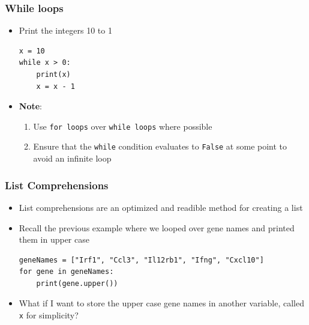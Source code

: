 \documentclass[xcolor=table]{beamer}
\begin{document}
\begin{frame}[fragile]
\frametitle{While loops}

\begin{itemize}

\item Print the integers 10 to 1
\begin{lstlisting}[style=python]
x = 10
while x > 0:
    print(x)
    x = x - 1
\end{lstlisting}

\item \textbf{Note}: 
\begin{enumerate}\addtolength{\itemsep}{0.5\baselineskip}
\item Use \texttt{for loops} over \texttt{while loops} where possible
\item Ensure that the \texttt{while} condition evaluates to 
\texttt{False} at some point to avoid an infinite loop
\end{enumerate}

\end{itemize}

\end{frame}

\begin{frame}[fragile]
\frametitle{List Comprehensions}

\begin{itemize}\addtolength{\itemsep}{0.5\baselineskip}

\item<1-> List comprehensions are an optimized and readible method for creating a list

\item<2-> Recall the previous example where we looped over gene names and printed them in upper
case
\begin{lstlisting}[style=python]
geneNames = ["Irf1", "Ccl3", "Il12rb1", "Ifng", "Cxcl10"]
for gene in geneNames:
    print(gene.upper())
\end{lstlisting}

\item<3-> What if I want to store the upper case gene names in another variable, 
called \texttt{x} for simplicity?

\end{itemize}

\end{frame}
\end{document}
